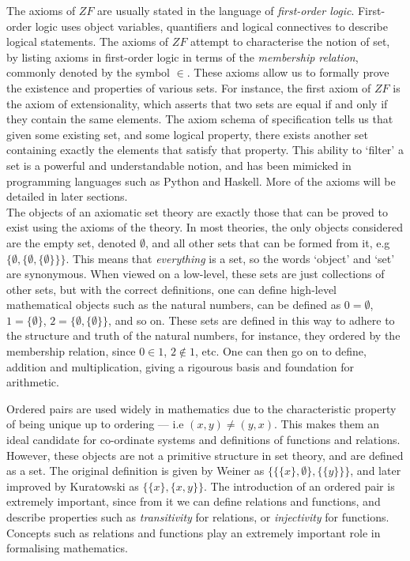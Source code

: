 \documentclass[11pt]{report}
\theoremstyle{definition}
\theoremstyle{theorem}
\theoremstyle{lemma}
\begin{document}
The axioms of $\mathit{ZF}$ are usually stated in the language of \emph{first-order logic}.
First-order logic uses object variables, quantifiers and logical connectives to describe logical statements.
The axioms of $\mathit{ZF}$ attempt to characterise the notion of set, by listing axioms in first-order logic in terms of the \emph{membership relation}, commonly denoted by the symbol $\in$.
These axioms allow us to formally prove the existence and properties of various sets.
For instance, the first axiom of $\mathit{ZF}$ is the axiom of extensionality, which asserts that two sets are equal if and only if they contain the same elements.
The axiom schema of specification tells us that given some existing set, and some logical property, there exists another set containing exactly the elements that satisfy that property.
This ability to `filter' a set is a powerful and understandable notion, and has been mimicked in programming languages such as Python and Haskell. 
More of the axioms will be detailed in later sections.\\

The objects of an axiomatic set theory are exactly those that can be proved to exist using the axioms of the theory. 
In most theories, the only objects considered are the empty set, denoted $\emptyset$, and all other sets that can be formed from it, e.g $\{\emptyset, \{\emptyset, \{\emptyset\}\}\}$. 
This means that \emph{everything} is a set, so the words `object' and `set' are synonymous.
When viewed on a low-level, these sets are just collections of other sets, but with the correct definitions, one can define high-level mathematical objects such as the natural numbers, can be defined as $0 = \emptyset$, $1=\{\emptyset\}$, $2=\{\emptyset, \{\emptyset\}\}$, and so on.
These sets are defined in this way to adhere to the structure and truth of the natural numbers, for instance, they ordered by the membership relation, since $0\in 1$, $2\notin 1$, etc.
One can then go on to define, addition and multiplication, giving a rigourous basis and foundation for arithmetic.

Ordered pairs are used widely in mathematics due to the characteristic property of being unique up to ordering --- i.e $(x,y) \neq (y,x)$.
This makes them an ideal candidate for co-ordinate systems and definitions of functions and relations.
However, these objects are not a primitive structure in set theory, and are defined as a set.
The original definition is given by Weiner as $\{\{\{x\},\emptyset\},\{\{y\}\}\}$, and later improved by Kuratowski as $\{\{x\},\{x,y\}\}$.
The introduction of an ordered pair is extremely important, since from it we can define relations and functions, and describe properties such as \emph{transitivity} for relations, or \emph{injectivity} for functions.
Concepts such as relations and functions play an extremely important role in formalising mathematics.
\end{document}

